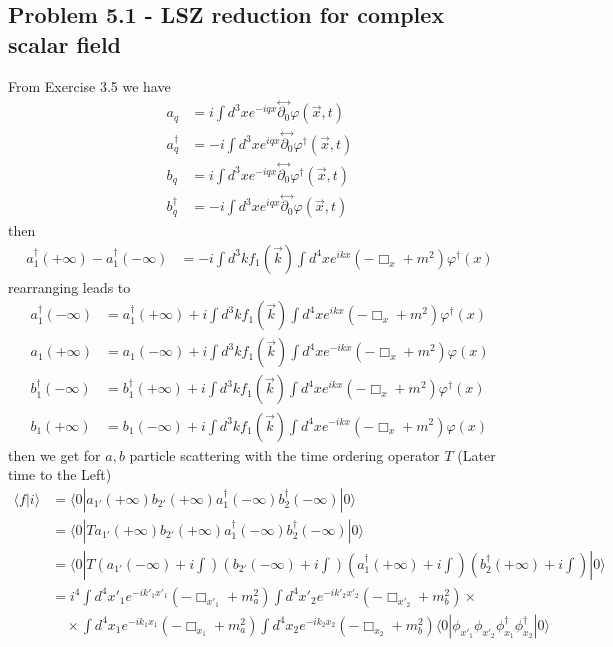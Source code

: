 \documentclass[10pt,a4paper]{book}
\theoremstyle{definition}
\begin{document}
\subsection{Problem 5.1 - LSZ reduction for complex scalar field}
From Exercise 3.5 we have
\begin{align}
a_q&=i\int d^3x e^{-iqx}\stackrel{\leftrightarrow}{\partial_0}\varphi(\vec{x},t)\\
a_q^\dagger&=-i\int d^3x e^{iqx}\stackrel{\leftrightarrow}{\partial_0}\varphi^\dagger(\vec{x},t)\\
b_q&=i\int d^3x e^{-iqx}\stackrel{\leftrightarrow}{\partial_0}\varphi^\dagger(\vec{x},t)\\
b_q^\dagger&=-i\int d^3x e^{iqx}\stackrel{\leftrightarrow}{\partial_0}\varphi(\vec{x},t)
\end{align}
then
\begin{align}
a^\dagger_1(+\infty)-a^\dagger_1(-\infty)
&=-i\int d^3k f_1(\vec{k})\int d^4x e^{ikx}(-\Box_x+m^2)\varphi^\dagger(x)
\end{align}
rearranging leads to
\begin{align}
a^\dagger_1(-\infty)&=a^\dagger_1(+\infty)+i\int d^3k f_1(\vec{k})\int d^4x e^{ikx}(-\Box_x+m^2)\varphi^\dagger(x)\\
a_1(+\infty)&=a_1(-\infty)+i\int d^3k f_1(\vec{k})\int d^4x e^{-ikx}(-\Box_x+m^2)\varphi(x)\\
b^\dagger_1(-\infty)&=b^\dagger_1(+\infty)+i\int d^3k f_1(\vec{k})\int d^4x e^{ikx}(-\Box_x+m^2)\varphi^\dagger(x)\\
b_1(+\infty)&=b_1(-\infty)+i\int d^3k f_1(\vec{k})\int d^4x e^{-ikx}(-\Box_x+m^2)\varphi(x)
\end{align}
then we get for $a,b$ particle scattering with the time ordering operator $T$ (Later time to the Left)
\begin{align}
\langle f|i\rangle
&=\langle 0|a_{1'}(+\infty)b_{2'}(+\infty)a^\dagger_1(-\infty)b^\dagger_2(-\infty)|0\rangle\\
&=\langle 0|Ta_{1'}(+\infty)b_{2'}(+\infty)a^\dagger_1(-\infty)b^\dagger_2(-\infty)|0\rangle\\
&=\langle 0|T(a_{1'}(-\infty)+i\int)(b_{2'}(-\infty)+i\int)(a^\dagger_{1}(+\infty)+i\int)(b^\dagger_{2}(+\infty)+i\int)|0\rangle\\
&=i^4
\int d^4x'_1e^{-ik'_1x'_1}(-\Box_{x'_1}+m_a^2)
\int d^4x'_2e^{-ik'_2x'_2}(-\Box_{x'_2}+m_b^2)\times\\
&\quad\times
\int d^4x_1e^{-ik_1x_1}(-\Box_{x_1}+m_a^2)
\int d^4x_2e^{-ik_2x_2}(-\Box_{x_2}+m_b^2)\langle0|\phi_{x'_1}\phi_{x'_2}\phi^\dagger_{x_1}\phi^\dagger_{x_2}|0\rangle
\end{align}
\end{document}
